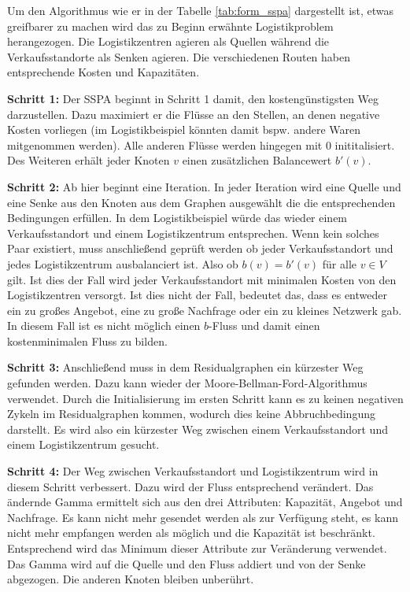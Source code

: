 Um den Algorithmus wie er in der Tabelle \ref{tab:form_sspa} dargestellt ist, etwas greifbarer zu machen wird das zu Beginn erwähnte Logistikproblem herangezogen. Die Logistikzentren agieren als Quellen während die Verkaufsstandorte als Senken agieren. Die verschiedenen Routen haben entsprechende Kosten und Kapazitäten. 

\textbf{Schritt 1:} Der SSPA beginnt in Schritt 1 damit, den kostengünstigsten Weg darzustellen. Dazu maximiert er die Flüsse an den Stellen, an denen negative Kosten vorliegen (im Logistikbeispiel könnten damit bspw. andere Waren mitgenommen werden). Alle anderen Flüsse werden hingegen mit $0$ inititalisiert. Des Weiteren erhält jeder Knoten $v$ einen zusätzlichen Balancewert $b'(v)$.

\textbf{Schritt 2:} Ab hier beginnt eine Iteration. In jeder Iteration wird eine Quelle und eine Senke aus den Knoten aus dem Graphen ausgewählt die die entsprechenden Bedingungen erfüllen. In dem Logistikbeispiel würde das wieder einem Verkaufsstandort und einem Logistikzentrum entsprechen. Wenn kein solches Paar existiert, muss anschließend geprüft werden ob jeder Verkaufsstandort und jedes Logistikzentrum ausbalanciert ist. Also ob $b(v) = b'(v)$ für alle $v \in V$ gilt. Ist dies der Fall wird jeder Verkaufsstandort mit minimalen Kosten von den Logistikzentren versorgt. Ist dies nicht der Fall, bedeutet das, dass es entweder ein zu großes Angebot, eine zu große Nachfrage oder ein zu kleines Netzwerk gab. In diesem Fall ist es nicht möglich einen $b$-Fluss und damit einen kostenminimalen Fluss zu bilden.

\textbf{Schritt 3:} Anschließend muss in dem Residualgraphen ein kürzester Weg gefunden werden. Dazu kann wieder der Moore-Bellman-Ford-Algorithmus verwendet. Durch die Initialisierung im ersten Schritt kann es zu keinen negativen Zykeln im Residualgraphen kommen, wodurch dies keine Abbruchbedingung darstellt. Es wird also ein kürzester Weg zwischen einem Verkaufsstandort und einem Logistikzentrum gesucht.

\textbf{Schritt 4:} Der Weg zwischen Verkaufsstandort und Logistikzentrum wird in diesem Schritt verbessert. Dazu wird der Fluss entsprechend verändert. Das ändernde Gamma ermittelt sich aus den drei Attributen: Kapazität, Angebot und Nachfrage. Es kann nicht mehr gesendet werden als zur Verfügung steht, es kann nicht mehr empfangen werden als möglich und die Kapazität ist beschränkt. Entsprechend wird das Minimum dieser Attribute zur Veränderung verwendet. Das Gamma wird auf die Quelle und den Fluss addiert und von der Senke abgezogen. Die anderen Knoten bleiben unberührt.


